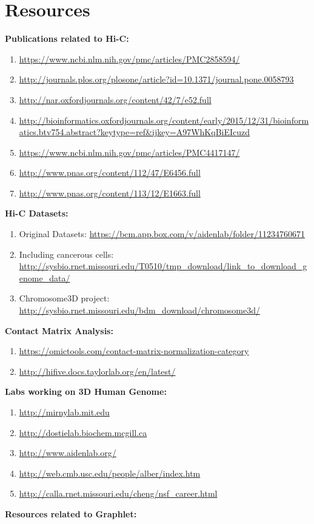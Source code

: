 \documentclass{article}
\begin{document}
\section{Resources}
\textbf{Publications related to Hi-C:}
\begin{enumerate}
    \item \url{https://www.ncbi.nlm.nih.gov/pmc/articles/PMC2858594/}
    \item \url{http://journals.plos.org/plosone/article?id=10.1371/journal.pone.0058793 }
    \item \url{http://nar.oxfordjournals.org/content/42/7/e52.full}
    \item \url{http://bioinformatics.oxfordjournals.org/content/early/2015/12/31/bioinformatics.btv754.abstract?keytype=ref&ijkey=A97WhKqBiEIcuzd}
    \item \url{https://www.ncbi.nlm.nih.gov/pmc/articles/PMC4417147/}
    \item \url{http://www.pnas.org/content/112/47/E6456.full}
    \item \url{http://www.pnas.org/content/113/12/E1663.full}
\end{enumerate}
\textbf{Hi-C Datasets:}
\begin{enumerate}
    \item Original Datasets: \url{https://bcm.app.box.com/v/aidenlab/folder/11234760671}
    \item Including cancerous cells: \url{http://sysbio.rnet.missouri.edu/T0510/tmp_download/link_to_download_genome_data/}
    \item Chromosome3D project: \url{http://sysbio.rnet.missouri.edu/bdm_download/chromosome3d/}
\end{enumerate}
\textbf{Contact Matrix Analysis:}
\begin{enumerate}
    \item \url{https://omictools.com/contact-matrix-normalization-category}
    \item \url{http://hifive.docs.taylorlab.org/en/latest/}
\end{enumerate}

\textbf{Labs working on 3D Human Genome:}

\begin{enumerate}
    \item \url{http://mirnylab.mit.edu}
    \item \url{http://dostielab.biochem.mcgill.ca}
    \item \url{http://www.aidenlab.org/}
    \item \url{http://web.cmb.usc.edu/people/alber/index.htm}
    \item \url{http://calla.rnet.missouri.edu/cheng/nsf_career.html}
\end{enumerate}
\textbf{Resources related to Graphlet:}
\end{document}
